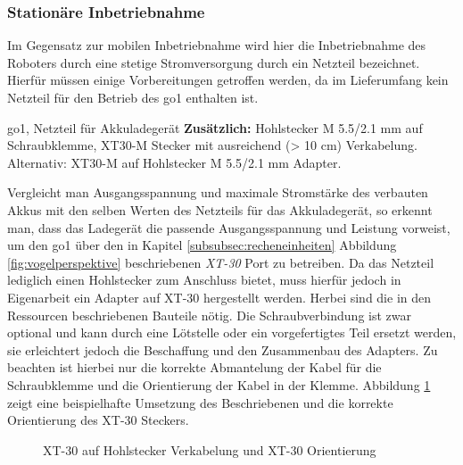 \subsubsection{Stationäre Inbetriebnahme}
\label{subsubsec:inbetriebnahme_netzteil}

Im Gegensatz zur mobilen Inbetriebnahme wird hier die Inbetriebnahme des Roboters durch eine stetige Stromversorgung durch ein Netzteil
bezeichnet.
Hierfür müssen einige Vorbereitungen getroffen werden, da im Lieferumfang kein Netzteil für den Betrieb des \gls{go1}
enthalten ist.

\begin{requirements}
    \gls{go1}, Netzteil für Akkuladegerät\newline
    \textbf{Zusätzlich:} Hohlstecker M \num{5,5}/\num{2,1} mm auf Schraubklemme, XT30-M Stecker mit ausreichend (> \num{10} cm)
    Verkabelung.
    Alternativ: XT30-M auf Hohlstecker M \num{5,5}/\num{2,1} mm Adapter.
\end{requirements}

Vergleicht man Ausgangsspannung und maximale Stromstärke des verbauten Akkus mit den selben Werten des Netzteils für das
Akkuladegerät, so erkennt man, dass das Ladegerät die passende Ausgangsspannung und Leistung vorweist, um den \gls{go1}
über den in Kapitel \ref{subsubsec:recheneinheiten} Abbildung \ref{fig:vogelperspektive} beschriebenen \emph{XT-30} Port
zu betreiben.
Da das Netzteil lediglich einen Hohlstecker zum Anschluss bietet, muss hierfür jedoch in Eigenarbeit ein Adapter auf XT-30
hergestellt werden.
Herbei sind die in den Ressourcen beschriebenen Bauteile nötig.
Die Schraubverbindung ist zwar optional und kann durch eine
Lötstelle oder ein vorgefertigtes Teil ersetzt werden, sie erleichtert jedoch die Beschaffung und den Zusammenbau des Adapters.
Zu beachten ist hierbei nur die korrekte Abmantelung der Kabel für die Schraubklemme und die Orientierung der Kabel in der
Klemme.
Abbildung \ref{fig:xt30} zeigt eine beispielhafte Umsetzung des Beschriebenen und die korrekte Orientierung des XT-30 Steckers.

\begin{figure}[h]
    \caption{XT-30 auf Hohlstecker Verkabelung und XT-30 Orientierung}\label{fig:xt30}
\end{figure}

